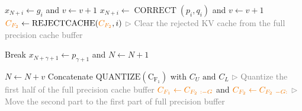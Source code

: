 \begin{algorithm*}[h]
\begin{algorithmic}[1]
            \STATE $x_{N + i} \leftarrow g_i$ and $v \leftarrow v + 1$ 
        \ELSE
            \STATE $x_{N + i} \leftarrow \operatorname{CORRECT}(p_i, q_i)$ and $v \leftarrow v + 1$ 
            \STATE $\textcolor{orange!95!black}{C_{F_2}} \leftarrow \operatorname{REJECTCACHE}(\textcolor{orange!95!black}{C_{F_2}}, i)$ \hfill \textcolor{gray}{$\triangleright$ Clear the rejected KV cache from the full precision cache buffer}
            
            Break
        \ENDIF
            \STATE $x_{N + \gamma + 1} \leftarrow p_{\gamma + 1}$ and $N \leftarrow N + 1$
        \ENDIF
    \ENDFOR

    $N \leftarrow N + v$ 
        \STATE Concatenate $\operatorname{QUANTIZE(C_{F_1})}$ with \textcolor{orange!95!black}{$C_U \text{~and~} C_L$}  \hfill \textcolor{gray}{$\triangleright$ Quantize the first half of the full precision cache buffer}
        \STATE $\textcolor{orange!95!black}{C_{F_1} \leftarrow C_{F_2~:-G}}$ and $\textcolor{orange!95!black}{C_{F_2} \leftarrow C_{F_2~-G:}}$ \hfill \textcolor{gray}{$\triangleright$ Move the second part to the first part of full precision buffer}
    \ENDIF
\ENDWHILE

\end{algorithmic}
\end{algorithm*}